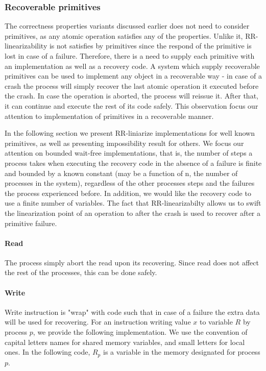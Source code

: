 \documentclass{article}
\begin{document}
\subsubsection*{Recoverable primitives}

The correctness properties variants discussed earlier does not need to consider primitives, as any atomic operation satisfies any of the properties. Unlike it, RR-linearizability is not satisfies by primitives since the respond of the primitive is lost in case of a failure. Therefore, there is a need to supply each primitive with an implementation as well as a recovery code. A system which supply recoverable primitives can be used to implement any object in a recoverable way - in case of a crash the process will simply recover the last atomic operation it executed before the crash. In case the operation is aborted, the process will reissue it. After that, it can continue and execute the rest of its code safely. This observation focus our attention to implementation of primitives in a recoverable manner.

In the following section we present RR-liniarize implementations for well known primitives, as well as presenting impossibility result for others. We focus our attention on bounded wait-free implementations, that is, the number of steps a process takes when executing the recovery code in the absence of a failure is finite and bounded by a known constant (may be a function of n, the number of processes in the system), regardless of the other processes steps and the failures the process experienced before. In addition, we would like the recovery code to use a finite number of variables.
The fact that RR-linearizabilty allows us to swift the linearization point of an operation to after the crash is used to recover after a primitive failure.

\paragraph*{Read}

The process simply abort the read upon its recovering. Since read does not affect the rest of the processes, this can be done safely.

\paragraph*{Write}
Write instruction is "wrap" with code such that in case of a failure the extra data will be used for recovering. For an instruction writing value $x$ to variable $R$ by process $p$, we provide the following implementation. We use the convention of capital letters names for shared memory variables, and small letters for local ones. In the following code, $R_p$ is a variable in the memory designated for process $p$.
\end{document}
